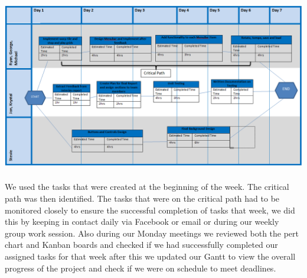 \documentclass[10pt,a4paper]{article}
\begin{document}
\\
\includegraphics[scale=0.5]{pert.png}\\
\\
We used the tasks that were created at the beginning of the week. The critical path was then identified. The tasks that were on the critical path had to be monitored closely to ensure the successful completion of tasks that week, we did this by keeping in contact daily via Facebook or email or during our weekly group work session. Also during our Monday meetings we reviewed both the pert chart and Kanban boards and checked if we had successfully completed our assigned tasks for that week after this we updated our Gantt to view the overall progress of the project and check if we were on schedule to meet deadlines.\\
\end{document}
